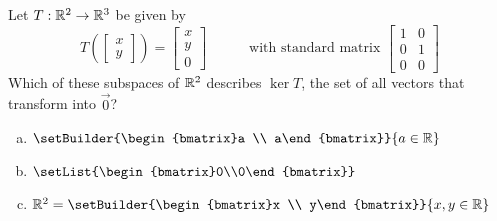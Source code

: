 \begin{activity}{5}
Let $T: \mathbb{R}^2 \rightarrow \mathbb{R}^3$ be given by
\[
  T\left(\begin{bmatrix}x \\ y \end{bmatrix} \right)
    =
  \begin{bmatrix} x \\ y \\ 0 \end{bmatrix}
    \hspace{3em}
    \text{with standard matrix }
  \begin{bmatrix} 1 & 0 \\ 0 & 1 \\ 0 & 0 \end{bmatrix}
\]
Which of these subspaces of \(\mathbb{R}^2\) describes \(\ker T\),
the set of all vectors that transform into \(\vec 0\)?
\begin{enumerate}[a)]
\item \(\setBuilder{\begin{bmatrix}a \\ a\end{bmatrix}}{a\in\IR}\)
\item \(\setList{\begin{bmatrix}0\\0\end{bmatrix}}\)
\item \(\IR^2=\setBuilder{\begin{bmatrix}x \\ y\end{bmatrix}}{x,y\in\IR}\)
\end{enumerate}
\end{activity}

